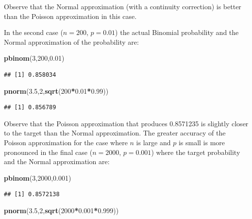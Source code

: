 \documentclass[
]{krantz}
\makeatletter
\newenvironment{Shaded}{\begin{snugshade}}{\end{snugshade}}
\newcommand{\DecValTok}[1]{\textcolor[rgb]{0.00,0.00,0.81}{#1}}
\newcommand{\FloatTok}[1]{\textcolor[rgb]{0.00,0.00,0.81}{#1}}
\newcommand{\KeywordTok}[1]{\textcolor[rgb]{0.13,0.29,0.53}{\textbf{#1}}}
\newcommand{\NormalTok}[1]{#1}
\newcommand{\OperatorTok}[1]{\textcolor[rgb]{0.81,0.36,0.00}{\textbf{#1}}}
\newenvironment{kframe}{%
\medskip{}
\setlength{\fboxsep}{.8em}
 \def\at@end@of@kframe{}%
 \ifinner\ifhmode%
  \def\at@end@of@kframe{\end{minipage}}%
  \begin{minipage}{\columnwidth}%
 \fi\fi%
 \def\FrameCommand##1{\hskip\@totalleftmargin \hskip-\fboxsep
 \colorbox{shadecolor}{##1}\hskip-\fboxsep
     \hskip-\linewidth \hskip-\@totalleftmargin \hskip\columnwidth}%
 \MakeFramed {\advance\hsize-\width
   \@totalleftmargin\z@ \linewidth\hsize
   \@setminipage}}%
 {\par\unskip\endMakeFramed%
 \at@end@of@kframe}
\renewenvironment{Shaded}{\begin{kframe}}{\end{kframe}}
\theoremstyle{definition}
\theoremstyle{definition}
\theoremstyle{definition}
\theoremstyle{remark}
\makeatother
\begin{document}
Observe that the Normal approximation (with a continuity correction) is
better than the Poisson approximation in this case.

In the second case (\(n=200\), \(p=0.01\)) the actual Binomial probability
and the Normal approximation of the probability are:

\begin{Shaded}
\begin{Highlighting}[]
\KeywordTok{pbinom}\NormalTok{(}\DecValTok{3}\NormalTok{,}\DecValTok{200}\NormalTok{,}\FloatTok{0.01}\NormalTok{)}
\end{Highlighting}
\end{Shaded}

\begin{verbatim}
## [1] 0.858034
\end{verbatim}

\begin{Shaded}
\begin{Highlighting}[]
\KeywordTok{pnorm}\NormalTok{(}\FloatTok{3.5}\NormalTok{,}\DecValTok{2}\NormalTok{,}\KeywordTok{sqrt}\NormalTok{(}\DecValTok{200}\OperatorTok{*}\FloatTok{0.01}\OperatorTok{*}\FloatTok{0.99}\NormalTok{))}
\end{Highlighting}
\end{Shaded}

\begin{verbatim}
## [1] 0.856789
\end{verbatim}

Observe that the Poisson approximation that produces 0.8571235 is
slightly closer to the target than the Normal approximation. The greater
accuracy of the Poisson approximation for the case where \(n\) is large
and \(p\) is small is more pronounced in the final case (\(n=2000\),
\(p=0.001\)) where the target probability and the Normal approximation
are:

\begin{Shaded}
\begin{Highlighting}[]
\KeywordTok{pbinom}\NormalTok{(}\DecValTok{3}\NormalTok{,}\DecValTok{2000}\NormalTok{,}\FloatTok{0.001}\NormalTok{)}
\end{Highlighting}
\end{Shaded}

\begin{verbatim}
## [1] 0.8572138
\end{verbatim}

\begin{Shaded}
\begin{Highlighting}[]
\KeywordTok{pnorm}\NormalTok{(}\FloatTok{3.5}\NormalTok{,}\DecValTok{2}\NormalTok{,}\KeywordTok{sqrt}\NormalTok{(}\DecValTok{2000}\OperatorTok{*}\FloatTok{0.001}\OperatorTok{*}\FloatTok{0.999}\NormalTok{))}
\end{Highlighting}
\end{Shaded}
\end{document}
